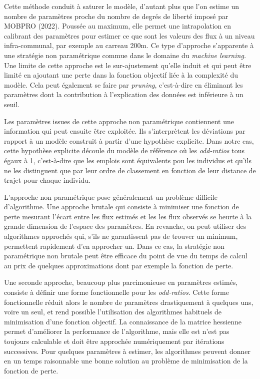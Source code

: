 \documentclass[
  10pt,
  a4paper,
  numbers=noendperiod,
  DIV=9]{scrreprt}
\begin{document}
Cette méthode conduit à saturer le modèle, d'autant plus que l'on estime
un nombre de paramètres proche du nombre de degrés de liberté imposé par
MOBPRO (2022). Poussée au maximum, elle permet une intrapolation en
calibrant des paramètres pour estimer ce que sont les valeurs des flux à
un niveau infra-communal, par exemple au carreau 200m. Ce type
d'approche s'apparente à une stratégie non paramétrique commue dans le
domaine du \emph{machine learning.} Une limite de cette approche est le
sur-ajustement qu'elle induit et qui peut être limité en ajoutant une
perte dans la fonction objectif liée à la complexité du modèle. Cela
peut également se faire par \emph{pruning}, c'est-à-dire en éliminant
les paramètres dont la contribution à l'explication des données est
inférieure à un seuil.

Les paramètres issues de cette approche non paramétrique contiennent une
information qui peut ensuite être exploitée. Ils s'interprètent les
déviations par rapport à un modèle construit à partir d'une hypothèse
explicite. Dans notre cas, cette hypothèse explicite découle du modèle
de référence où les \emph{odd-ratios} tous égaux à 1, c'est-à-dire que
les emplois sont équivalents pou les individus et qu'ils ne les
distinguent que par leur ordre de classement en fonction de leur
distance de trajet pour chaque individu.

L'approche non paramétrique pose généralement un problème difficile
d'algorithme. Une approche brutale qui consiste à minimiser une fonction
de perte mesurant l'écart entre les flux estimés et les les flux
observés se heurte à la grande dimension de l'espace des paramètres. En
revanche, on peut utiliser des algorithmes approchés qui, s'ils ne
garantissent pas de trouver un minimum, permettent rapidement d'en
approcher un. Dans ce cas, la stratégie non paramétrique non brutale
peut être efficace du point de vue du temps de calcul au prix de
quelques approximations dont par exemple la fonction de perte.

Une seconde approche, beaucoup plus parcimonieuse en paramètres estimés,
consiste à définir une forme fonctionnelle pour les \emph{odd-ratios}.
Cette forme fonctionnelle réduit alors le nombre de paramètres
drastiquement à quelques uns, voire un seul, et rend possible
l'utilisation des algorithmes habituels de minimisation d'une fonction
objectif. La connaissance de la matrice hessienne permet d'améliorer la
performance de l'algorithme, mais elle est n'est pas toujours calculable
et doit être approchée numériquement par itérations successives. Pour
quelques paramètres à estimer, les algorithmes peuvent donner en un
temps raisonnable une bonne solution au problème de minimisation de la
fonction de perte.
\end{document}
